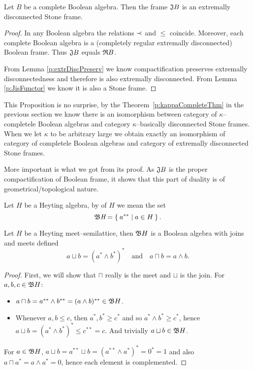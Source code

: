 \begin{proposition}
    Let $B$ be a complete Boolean algebra. Then the frame $\mathfrak{J} B$ is an extremally disconnected Stone frame.
\end{proposition}
\begin{proof}
    In any Boolean algebra the relations $\prec$ and $\leq$ coincide. Moreover, each complete Boolean algebra is a (completely regular extremally disconnected) Boolean frame. Thus $\mathfrak{J}{B}$ equals $\mathfrak{R}{B}$.

    From Lemma \ref{p:extrDiscPreserv} we know compactification preserves extremally disconnectedness and therefore  is also extremally disconnected. From Lemma \ref{p:JisFunctor} we know it is also a Stone frame.
\end{proof}

This Proposition is no surprise, by the Theorem~\ref{p:kappaCompleteThm} in the previous section we know there is an isomorphism between category of $\kappa$--completele Boolean algebras and category $\kappa$--basically disconnected Stone frames. When we let $\kappa$ to be arbitrary large we obtain exactly an isomorphism of category of completele Boolean algebras and category of extremally disconnected Stone frames.

More important is what we got from its proof. As $\mathfrak{J} B$ is the proper compactification of Boolean frame, it shows that this part of duality is of geometrical/topological nature.

\begin{definition}
    Let $H$ be a Heyting algebra, by  of $H$ we mean the set
    $$
    \DEFSYM{Booleanization}{\Bo H} = \Set{ a^{**} | a \in H }.
    $$
\end{definition}

\begin{proposition}
    Let $H$ be a Heyting meet--semilattice, then $\mathfrak{B} H$ is a Boolean algebra with joins and meets defined
    $$ a \sqcup b = (a^* \wedge b^*)^* \quad\text{and}\quad a\sqcap b = a \wedge b.$$
\end{proposition}
\begin{proof}
    First, we will show that $\sqcap$ really is the meet and $\sqcup$ is the join. For $a,b,c \in \mathfrak{B} H$:

    \begin{itemize}
        \item $a\sqcap b = a^{**}\wedge b^{**} = (a\wedge b)^{**} \in \mathfrak{B} H$.
        \item Whenever $a,b \leq c$, then $a^*, b^*\geq c^*$ and so $a^*\wedge b^*\geq c^*$, hence $a\sqcup b = (a^*\wedge b^*)^* \leq c^{**} = c$. And trivially $a\sqcup b \in \mathfrak{B} H$.
    \end{itemize}

    For $a \in \mathfrak{B} H$, $a\sqcup b = a^{**}\sqcup b = (a^{**}\wedge a^*)^* = 0^* = 1$ and also $a\sqcap a^* = a\wedge a^* = 0$, hence each element is complemented.
\end{proof}

